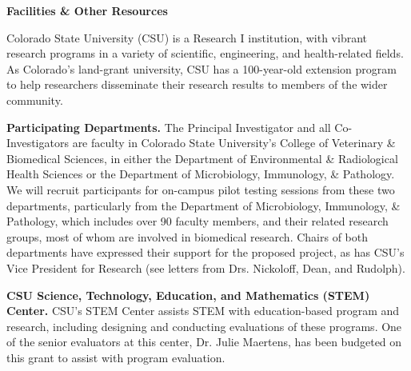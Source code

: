 \documentclass[pdftex,english,11pt,parskip=half]{scrartcl}
\begin{document}
\def\bf{\normalfont\bfseries}
\pagestyle{empty}

{\large \textbf{Facilities \& Other Resources}}

% 

Colorado State University (CSU) is a Research I institution, with vibrant research programs in a variety of scientific, engineering, and health-related fields. As Colorado’s land-grant university, CSU has a 100-year-old extension program to help researchers disseminate their research results to members of the wider community. 

\textbf{Participating Departments.} The Principal Investigator and all Co-Investigators are faculty in Colorado State University's College of Veterinary \& Biomedical Sciences, in either the Department of Environmental \& Radiological Health Sciences or the Department of Microbiology, Immunology, \& Pathology. We will recruit participants for on-campus pilot testing sessions from these two departments, particularly from the Department of Microbiology, Immunology, \& Pathology, which includes over 90 faculty members, and their related research groups, most of whom are involved in biomedical research. Chairs of both departments have expressed their support for the proposed project, as has CSU's Vice President for Research (see letters from Drs. Nickoloff, Dean, and Rudolph).

\textbf{CSU Science, Technology, Education, and Mathematics (STEM) Center.} CSU's STEM Center assists STEM with education-based program and research, including designing and conducting evaluations of these programs. One of the senior evaluators at this center, Dr. Julie Maertens, has been budgeted on this grant to assist with program evaluation.
\end{document}
